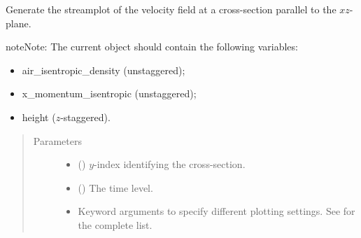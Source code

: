 \documentclass[letterpaper,10pt,english]{sphinxmanual}
\begin{document}
\begin{fulllineitems}
\begin{fulllineitems}
\begin{quote}
\begin{description}
\begin{itemize}
\end{itemize}

\end{description}\end{quote}

\end{fulllineitems}


\begin{fulllineitems}
\label{\detokenize{api:storages.state_isentropic.StateIsentropic.streamplot_xz}}
Generate the streamplot of the velocity field at a cross-section parallel to the \(xz\)-plane.

\begin{sphinxadmonition}{note}{Note:}
The current object should contain the following variables:
\begin{itemize}
\item {} 
air\_isentropic\_density (unstaggered);

\item {} 
x\_momentum\_isentropic (unstaggered);

\item {} 
height (\(z\)-staggered).

\end{itemize}
\end{sphinxadmonition}
\begin{quote}\begin{description}
\item[{Parameters}] \leavevmode\begin{itemize}
\item {} 
 () \textendash{} \(y\)-index identifying the cross-section.

\item {} 
 () \textendash{} The time level.

\item {} 
 \textendash{} Keyword arguments to specify different plotting settings.
See {\hyperref[\detokenize{api:tasmania.utils.utils_plot.streamplot_xz}]{}} for the complete list.

\end{itemize}

\end{description}\end{quote}

\end{fulllineitems}


\end{fulllineitems}
\end{document}
